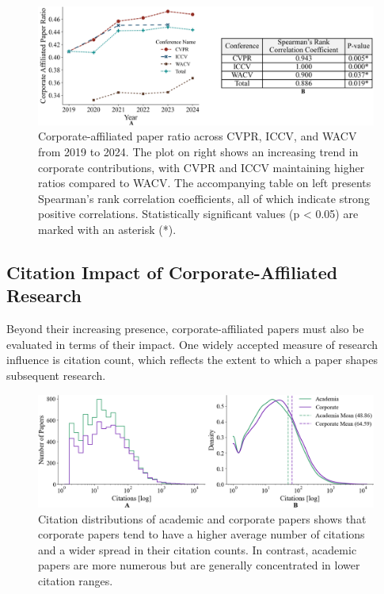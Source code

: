 \documentclass{article}
\begin{document}
\begin{figure}[ht]
    \centering
    \includegraphics[width=0.9\linewidth]{report/images/corporate_ratio_table.png}
    \caption{Corporate-affiliated paper ratio across CVPR, ICCV, and WACV from 2019 to 2024. The plot on right shows an increasing trend in corporate contributions, with CVPR and ICCV maintaining higher ratios compared to WACV. The accompanying table on left presents Spearman’s rank correlation coefficients, all of which indicate strong positive correlations. Statistically significant values (p < 0.05) are marked with an asterisk (*).}
    \label{fig:corporate_ratio_graph}
\end{figure}
\vspace{-15pt}
\subsection{Citation Impact of Corporate-Affiliated Research}
\vspace{-7pt}
Beyond their increasing presence, corporate-affiliated papers must also be evaluated in terms of their impact. One widely accepted measure of research influence is citation count, which reflects the extent to which a paper shapes subsequent research.
\begin{figure}[ht]
    \centering
    \includegraphics[width=0.9\linewidth]{report/images/ieee_citations.png}
    \caption{Citation distributions of academic and corporate papers shows that corporate papers tend to have a higher average number of citations and a wider spread in their citation counts. In contrast, academic papers are more numerous but are generally concentrated in lower citation ranges.}
    \label{fig:ieee_citations}
    \vspace{-15pt}
\end{figure}
\end{document}
